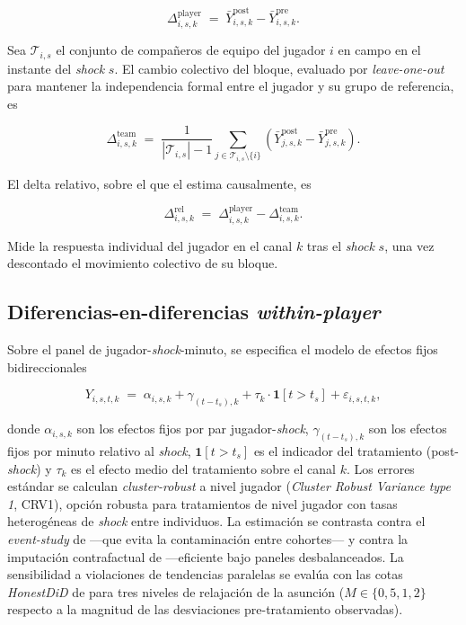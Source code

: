 \[
\Delta^{\text{player}}_{i,s,k} \;=\; \bar{Y}^{\text{post}}_{i,s,k} - \bar{Y}^{\text{pre}}_{i,s,k}.
\]

Sea $\mathcal{T}_{i,s}$ el conjunto de compañeros de equipo del
jugador $i$ en campo en el instante del \textit{shock} $s$. El cambio
colectivo del bloque, evaluado por \textit{leave-one-out} para
mantener la independencia formal entre el jugador y su grupo de
referencia, es

\[
\Delta^{\text{team}}_{i,s,k} \;=\; \frac{1}{|\mathcal{T}_{i,s}| - 1} \sum_{j \in \mathcal{T}_{i,s} \setminus \{i\}} \left( \bar{Y}^{\text{post}}_{j,s,k} - \bar{Y}^{\text{pre}}_{j,s,k} \right).
\]

El delta relativo, sobre el que el \CCV estima causalmente, es

\[
\Delta^{\text{rel}}_{i,s,k} \;=\; \Delta^{\text{player}}_{i,s,k} - \Delta^{\text{team}}_{i,s,k}.
\]

Mide la respuesta individual del jugador en el canal $k$ tras el
\textit{shock} $s$, una vez descontado el movimiento colectivo de su
bloque.

\subsection{Diferencias-en-diferencias \textit{within-player}}

Sobre el panel de jugador-\textit{shock}-minuto, se especifica el
modelo de efectos fijos bidireccionales

\[
Y_{i,s,t,k} \;=\; \alpha_{i,s,k} + \gamma_{(t-t_s),k} + \tau_k \cdot \mathbf{1}[t > t_s] + \varepsilon_{i,s,t,k},
\]

donde $\alpha_{i,s,k}$ son los efectos fijos por par
jugador-\textit{shock}, $\gamma_{(t-t_s),k}$ son los efectos fijos por
minuto relativo al \textit{shock}, $\mathbf{1}[t > t_s]$ es el
indicador del tratamiento (post-\textit{shock}) y $\tau_k$ es el
efecto medio del tratamiento sobre el canal $k$. Los errores estándar
se calculan \textit{cluster-robust} a nivel jugador (\textit{Cluster
Robust Variance type 1}, CRV1), opción robusta para tratamientos de
nivel jugador con tasas heterogéneas de \textit{shock} entre individuos. La estimación se contrasta contra el
\textit{event-study} de \citeauthor{SunAbraham2021} ---que evita la
contaminación entre cohortes--- y contra la imputación contrafactual
de \citeauthor{BorusyakJaravelSpiess2024} ---eficiente bajo paneles
desbalanceados. La sensibilidad a violaciones de tendencias paralelas
se evalúa con las cotas \textit{HonestDiD} de
\citeauthor{RambachanRoth2023} para tres niveles de relajación de la
asunción ($M \in \{0{,}5, 1, 2\}$ respecto a la magnitud de las
desviaciones pre-tratamiento observadas).

